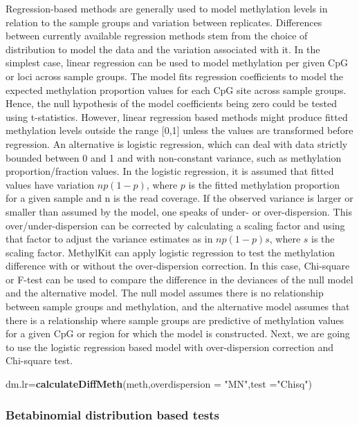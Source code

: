 \documentclass[12pt,]{krantz}
\newenvironment{Shaded}{\begin{snugshade}}{\end{snugshade}}
\newcommand{\DataTypeTok}[1]{\textcolor[rgb]{0.13,0.29,0.53}{#1}}
\newcommand{\KeywordTok}[1]{\textcolor[rgb]{0.13,0.29,0.53}{\textbf{#1}}}
\newcommand{\NormalTok}[1]{#1}
\newcommand{\StringTok}[1]{\textcolor[rgb]{0.31,0.60,0.02}{#1}}
\begin{document}
Regression-based methods are generally used to model methylation levels in relation to the sample groups and variation between replicates. Differences between currently available regression methods stem from the choice of distribution to model the data and the variation associated with it. In the simplest case, linear regression can be used to model methylation per given CpG or loci across sample groups. The model fits regression coefficients to model the expected methylation proportion values for each CpG site across sample groups. Hence, the null hypothesis of the model coefficients being zero could be tested using t-statistics. However, linear regression based methods might produce fitted methylation levels outside the range {[}0,1{]} unless the values are transformed before regression. An alternative is logistic regression, which can deal with data strictly bounded between 0 and 1 and with non-constant variance, such as methylation proportion/fraction values. In the logistic regression, it is assumed that fitted values have variation \(np(1-p)\), where \(p\) is the fitted methylation proportion for a given sample and n is the read coverage. If the observed variance is larger or smaller than assumed by the model, one speaks of under- or over-dispersion. This over/under-dispersion can be corrected by calculating a scaling factor and using that factor to adjust the variance estimates as in \(np(1-p)s\), where \(s\) is the scaling factor. MethylKit can apply logistic regression to test the methylation difference with or without the over-dispersion correction. In this case, Chi-square or F-test can be used to compare the difference in the deviances of the null model and the alternative model. The null model assumes there is no relationship between sample groups and methylation, and the alternative model assumes that there is a relationship where sample groups are predictive of methylation values for a given CpG or region for which the model is constructed. Next, we are going to use the logistic regression based model with over-dispersion correction and Chi-square test.

\begin{Shaded}
\begin{Highlighting}[]
\NormalTok{dm.lr=}\KeywordTok{calculateDiffMeth}\NormalTok{(meth,}\DataTypeTok{overdispersion =} \StringTok{"MN"}\NormalTok{,}\DataTypeTok{test =}\StringTok{"Chisq"}\NormalTok{)}
\end{Highlighting}
\end{Shaded}

\hypertarget{betabinomial-distribution-based-tests}{%
\subsubsection{Betabinomial distribution based tests}\label{betabinomial-distribution-based-tests}}
\end{document}
